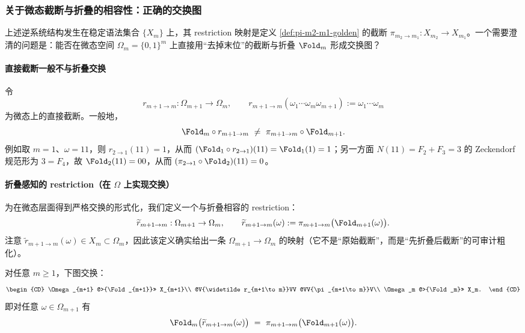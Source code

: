 \subsubsection{关于微态截断与折叠的相容性：正确的交换图}\label{subsec:fold-omega-restriction}
上述逆系统结构发生在稳定语法集合 $\{X_m\}$ 上，其 restriction 映射是定义 \ref{def:pi-m2-m1-golden} 的截断 $\pi_{m_2\to m_1}:X_{m_2}\to X_{m_1}$。一个需要澄清的问题是：能否在微态空间 $\Omega_m=\{0,1\}^m$ 上直接用“去掉末位”的截断与折叠 $\Fold_m$ 形成交换图？

\paragraph{直接截断一般不与折叠交换}
令
\[
r_{m+1\to m}:\Omega_{m+1}\to\Omega_m,\qquad
r_{m+1\to m}(\omega_1\cdots\omega_m\omega_{m+1}):=\omega_1\cdots\omega_m
\]
为微态上的直接截断。一般地，
\[
\Fold_m\circ r_{m+1\to m}\ \neq\ \pi_{m+1\to m}\circ \Fold_{m+1}.
\]
例如取 $m=1$、$\omega=11$，则 $r_{2\to 1}(11)=1$，从而 $(\Fold_1\circ r_{2\to 1})(11)=\Fold_1(1)=1$；另一方面 $N(11)=F_2+F_3=3$ 的 Zeckendorf 规范形为 $3=F_4$，故 $\Fold_2(11)=00$，从而 $(\pi_{2\to 1}\circ \Fold_2)(11)=0$。

\paragraph{折叠感知的 restriction（在 $\Omega$ 上实现交换）}
为在微态层面得到严格交换的形式化，我们定义一个与折叠相容的 restriction：
\[
\widetilde r_{m+1\to m}:\Omega_{m+1}\to \Omega_m,\qquad
\widetilde r_{m+1\to m}(\omega):=\pi_{m+1\to m}\bigl(\Fold_{m+1}(\omega)\bigr).
\]
注意 $\widetilde r_{m+1\to m}(\omega)\in X_m\subset\Omega_m$，因此该定义确实给出一条 $\Omega_{m+1}\to\Omega_m$ 的映射（它不是“原始截断”，而是“先折叠后截断”的可审计粗化）。

\begin{proposition}[跨分辨率相容的交换图]\label{prop:fold-omega-commute}
对任意 $m\ge 1$，下图交换：
\[
\begin{CD}
\Omega_{m+1} @>{\Fold_{m+1}}>> X_{m+1}\\
@V{\widetilde r_{m+1\to m}}VV @VV{\pi_{m+1\to m}}V\\
\Omega_m @>{\Fold_m}>> X_m.
\end{CD}
\]
即对任意 $\omega\in\Omega_{m+1}$ 有
\[
\Fold_m\bigl(\widetilde r_{m+1\to m}(\omega)\bigr)
\ =\
\pi_{m+1\to m}\bigl(\Fold_{m+1}(\omega)\bigr).
\]
\end{proposition}


